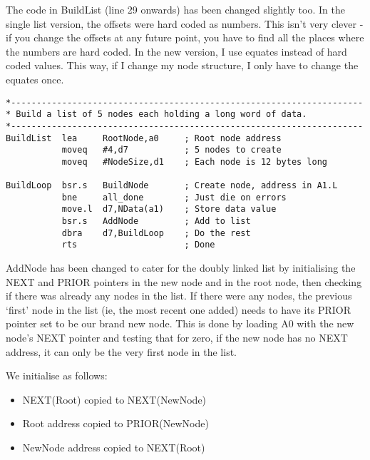 The code in BuildList (line 29 onwards) has been changed slightly too. In the single list version, the offsets were hard coded as numbers. This isn't very clever -{} if you change the offsets at any future point, you have to find all the places where the numbers are hard coded. In the new version, I use equates instead of hard coded values. This way, if I change my node structure, I only have to change the equates once.

\begin{lstlisting}[firstnumber=29,caption={Doubly Linked List - Demo Code - Build List}]
*---------------------------------------------------------------------
* Build a list of 5 nodes each holding a long word of data.
*---------------------------------------------------------------------
BuildList  lea     RootNode,a0     ; Root node address
           moveq   #4,d7           ; 5 nodes to create
           moveq   #NodeSize,d1    ; Each node is 12 bytes long

BuildLoop  bsr.s   BuildNode       ; Create node, address in A1.L
           bne     all_done        ; Just die on errors
           move.l  d7,NData(a1)    ; Store data value
           bsr.s   AddNode         ; Add to list
           dbra    d7,BuildLoop    ; Do the rest
           rts                     ; Done
\end{lstlisting}

AddNode has been changed to cater for the doubly linked list by initialising the NEXT
and PRIOR pointers in the new node and in the root node, then checking if there was
already any nodes in the list. If there were any nodes, the previous `first' node in
the list (ie, the most recent one added) needs to have its PRIOR pointer set to be our
brand new node. This is done by loading A0 with the new node's NEXT pointer and testing
that for zero, if the new node has no NEXT address, it can only be the very first node
in the list.

We initialise as follows:
\begin{itemize}[itemsep=0pt]

\item{}NEXT(Root) copied to NEXT(NewNode)


\item{}Root address copied to PRIOR(NewNode)


\item{}NewNode address copied to NEXT(Root)

\end{itemize}

